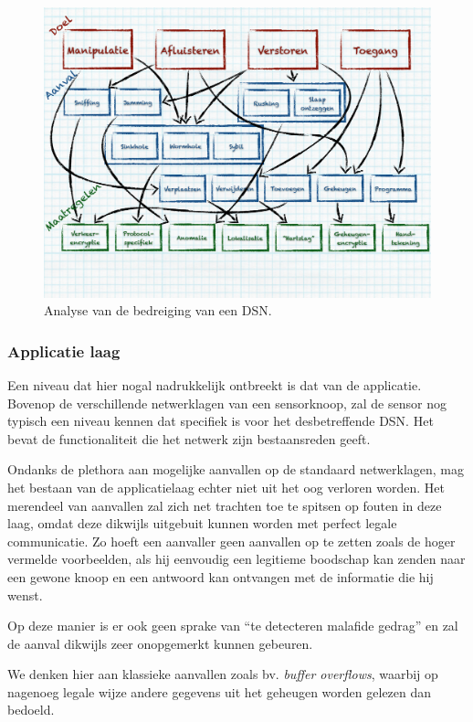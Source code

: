 \begin{figure}[ht]
  \centering
  \includegraphics[width=0.9\linewidth]{resources/wsn-threat-analysis.pdf}
  \caption{Analyse van de bedreiging van een DSN.}
  \label{fig:wsn-threat-analysis}
\end{figure}

\subsubsection*{Applicatie laag}

Een niveau dat hier nogal nadrukkelijk ontbreekt is dat van de applicatie.
Bovenop de verschillende netwerklagen van een sensorknoop, zal de sensor nog
typisch een niveau kennen dat specifiek is voor het desbetreffende DSN. Het
bevat de functionaliteit die het netwerk zijn bestaansreden geeft.

Ondanks de plethora aan mogelijke aanvallen op de standaard netwerklagen, mag
het bestaan van de applicatielaag echter niet uit het oog verloren worden. Het
merendeel van aanvallen zal zich net trachten toe te spitsen op fouten in deze
laag, omdat deze dikwijls uitgebuit kunnen worden met perfect legale
communicatie. Zo hoeft een aanvaller geen aanvallen op te zetten zoals de hoger
vermelde voorbeelden, als hij eenvoudig een legitieme boodschap kan zenden naar
een gewone knoop en een antwoord kan ontvangen met de informatie die hij wenst.

Op deze manier is er ook geen sprake van ``te detecteren malafide gedrag'' en
zal de aanval dikwijls zeer onopgemerkt kunnen gebeuren.

We denken hier aan klassieke aanvallen zoals bv. \emph{buffer overflows},
waarbij op nagenoeg legale wijze andere gegevens uit het geheugen worden
gelezen dan bedoeld.
